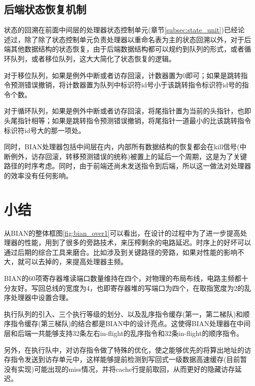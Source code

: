 \subsection{后端状态恢复机制}
状态的回溯在前面中间层的处理器状态控制单元(章节\ref{subsec:state_unit})已经论述过，除了除了状态控制单元负责处理器以重命名表为主的状态回溯以外，对于后端其他数据结构的状态恢复，由于后端数据结构都可以规约到队列的形式，或者循环队列，或者移位队列，这大大简化了状态恢复的逻辑。

对于移位队列，如果是例外中断或者访存回滚，计数器置为0即可；如果是跳转指令预测错误撤销，将计数器置为队列中标识符id号小于该跳转指令标识符id号的指令个数。

对于循环队列，如果是例外中断或者访存回滚，将尾指针置为当前的头指针，也即头尾指针相等；如果是跳转指令预测错误撤销，将尾指针一道最小的比该跳转指令标识符id号大的那一项处。

同时，BIAN处理器包括中间层在内，内部所有数据结构的恢复都会在kill信号(中断例外，访存回滚，转移预测错误的统称)被置上的延后一个周期，这是为了关键路径的时序考虑。同时，由于前端还尚未发送指令到后端，所以这一做法对处理器的效率没有任何影响。

\section{小结}

从BIAN的整体框图\ref{fig:bian_over1}可以看出，在设计的过程中为了进一步提高处理器的性能，用到了很多的旁路技术，来压榨剩余的电路延迟。时序上的好坏可以通过后期的综合工具来磨合。比如涉及到关键路径的旁路，如果对性能的影响不大，就可以去掉的，来提高处理器主频。

BIAN的60项寄存器堆读端口数量维持在四个，对物理的布局布线，电路主频都十分友好。写回总线的宽度为4，也即寄存器堆的写端口为四个，在取指宽度为2的乱序处理器中设置合理。

执行队列的引入、三个执行等级的划分、以及乱序指令缓存(第一，第二梯队)和顺序指令缓存(第三梯队)的结合都是BIAN中的设计亮点。这使得BIAN处理器在中间层和后端一共能够支持32条左右in-flight的乱序指令和32条in-flight的顺序指令。

另外，在执行队中，对访存指令做了特殊的优化，使之能够优先的将算出地址的访存指令发送到访存单元中，这样能够提前检测到写回式一级数据高速缓存(目前暂没有实现)可能出现的miss情况，并将cache行提前取回，从而更好的隐藏访存延迟。
